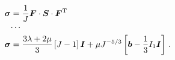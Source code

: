 \documentclass[10pt,letterpaper,oneside]{report}
\newcommand{\ten}[1]{\mbox{\boldmath $#1$}{}}
\newcommand{\scas}[1]{\mbox{{\scriptsize{${\rm{#1}}$}}}{}}
\begin{document}
\begin{align}
\ten{\sigma} 
={}& \frac{1}{J} \ten{F} \cdot \ten{S} \cdot \ten{F}^{\scas{T}} 
\\
\cdots{}& \notag \\
\ten{\sigma} 
={}& \frac{3 \lambda + 2 \mu}{3} \left[ J - 1 \right] \ten{I} + \mu J^{-5/3} \left[ \ten{b} - \frac{1}{3} I_1 \ten{I} \right] \, . 
\end{align}
\end{document}
